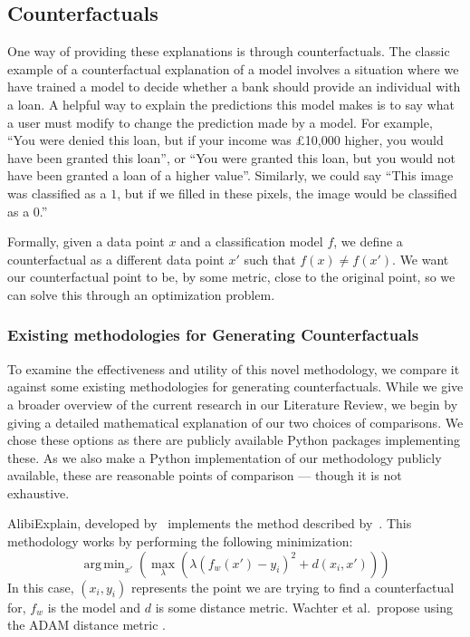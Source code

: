 \documentclass{article}
\DeclareMathOperator*{\argmin}{arg\,min}
\begin{document}
\subsection{Counterfactuals}
One way of providing these explanations is through counterfactuals. The classic example of a counterfactual explanation of a model involves a situation where we have trained a model to decide whether a bank should provide an individual with a loan. A helpful way to explain the predictions this model makes is to say what a user must modify to change the prediction made by a model. For example, ``You were denied this loan, but if your income was £10,000 higher, you would have been granted this loan'', or ``You were granted this loan, but you would not have been granted a loan of a higher value''. Similarly, we could say ``This image was classified as a \(1\), but if we filled in these pixels, the image would be classified as a \(0\).''

Formally, given a data point \(x\) and a classification model \(f\), we define a counterfactual as a different data point \(x'\) such that \(f(x) \neq f(x')\). We want our counterfactual point to be, by some metric, close to the original point, so we can solve this through an optimization problem.

\subsubsection{Existing methodologies for Generating Counterfactuals}
To examine the effectiveness and utility of this novel methodology, we compare it against some existing methodologies for generating counterfactuals. While we give a broader overview of the current research in our Literature Review, we begin by giving a detailed mathematical explanation of our two choices of comparisons. We chose these options as there are publicly available Python packages \citep{van_rossum_python_1995, klaise_alibi_2021} implementing these. As we also make a Python implementation of our methodology publicly available, these are reasonable points of comparison --- though it is not exhaustive. 

AlibiExplain, developed by~\cite{klaise_alibi_2021} implements the method described by~\cite{wachter_counterfactual_2017}. 
This methodology works by performing the following minimization:
\begin{equation}
    \argmin_{{x'}} 
    \left(
        \max_{{\lambda}} \left(
            \lambda 
            \left(
                f_{w} \left({x'}\right) - y_i
            \right)^2 %
            +
            d 
            \left(
               x_i, {x'}
            \right)
        \right)
    \right)
\end{equation}
In this case, \(\left(x_i,y_i\right)\) represents the point we are trying to find a counterfactual for, \(f_w\) is the model and \(d\) is some distance metric. Wachter et al.\ propose using the ADAM distance metric \citep{kingma_adam_2017}. 
\end{document}
